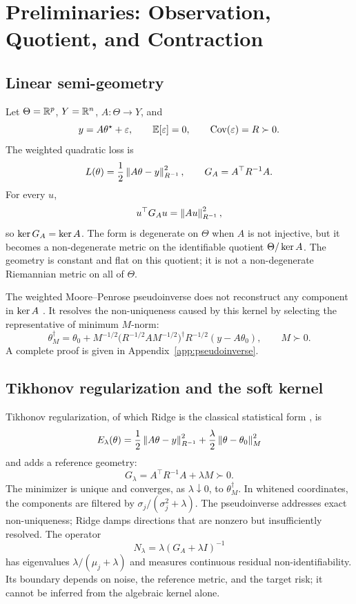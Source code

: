 \section{Preliminaries: Observation, Quotient, and Contraction}
\subsection{Linear semi-geometry}
Let $\Theta=\mathbb{R}^p$, $Y=\mathbb{R}^n$, $A:\Theta\to Y$, and
\[
y=A\theta^\star+\varepsilon,\qquad \mathbb{E}[\varepsilon]=0,\qquad \operatorname{Cov}(\varepsilon)=R\succ0.
\]
The weighted quadratic loss is
\begin{equation}
L(\theta)=\frac12\left\lVert A\theta-y\right\rVert_{R^{-1}}^2,
\qquad
G_A=A^\top R^{-1}A.
\end{equation}
For every $u$,
\[
u^\top G_Au=\left\lVert Au\right\rVert_{R^{-1}}^2,
\]
so $\operatorname{ker} G_A=\operatorname{ker} A$. The form is degenerate on $\Theta$ when $A$ is not injective, but it becomes a non-degenerate metric on the identifiable quotient $\Theta/\operatorname{ker} A$. The geometry is constant and flat on this quotient; it is not a non-degenerate Riemannian metric on all of $\Theta$.

The weighted Moore--Penrose pseudoinverse does not reconstruct any component in $\operatorname{ker} A$ \citep{penrose1955}. It resolves the non-uniqueness caused by this kernel by selecting the representative of minimum $M$-norm:
\begin{equation}
\theta_M^\dagger
=
\theta_0+M^{-1/2}\bigl(R^{-1/2}AM^{-1/2}\bigr)^\dagger R^{-1/2}(y-A\theta_0),
\qquad M\succ0.
\end{equation}
A complete proof is given in Appendix~\ref{app:pseudoinverse}.

\subsection{Tikhonov regularization and the soft kernel}
Tikhonov regularization, of which Ridge is the classical statistical form \citep{tikhonov1963,hoerl1970}, is
\begin{equation}
E_\lambda(\theta)
=
\frac12\left\lVert A\theta-y\right\rVert_{R^{-1}}^2
+
\frac\lambda2\left\lVert \theta-\theta_0\right\rVert_M^2
\end{equation}
and adds a reference geometry:
\[
G_\lambda=A^\top R^{-1}A+\lambda M\succ0.
\]
The minimizer is unique and converges, as $\lambda\downarrow0$, to $\theta_M^\dagger$. In whitened coordinates, the components are filtered by $\sigma_j/(\sigma_j^2+\lambda)$. The pseudoinverse addresses exact non-uniqueness; Ridge damps directions that are nonzero but insufficiently resolved. The operator
\begin{equation}
N_\lambda=\lambda(G_A+\lambda I)^{-1}
\end{equation}
has eigenvalues $\lambda/(\mu_j+\lambda)$ and measures continuous residual non-identifiability. Its boundary depends on noise, the reference metric, and the target risk; it cannot be inferred from the algebraic kernel alone.

